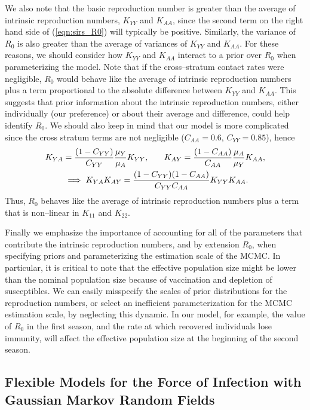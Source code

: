 We also note that the basic reproduction number is greater than the average of intrinsic reproduction numbers, $ K_{YY} $ and $ K_{AA} $, since the second term on the right hand side of (\ref{eqn:sirs_R0}) will typically be positive. Similarly, the variance of $ R_0 $ is also greater than the average of variances of $ K_{YY} $ and $ K_{AA} $. For these reasons, we should consider how $ K_{YY} $ and $ K_{AA} $ interact to a prior over $ R_0 $ when parameterizing the model. Note that if the cross--stratum contact rates were negligible, $ R_0 $ would behave like the average of intrinsic reproduction numbers plus a term proportional to the absolute difference between $ K_{YY} $ and $ K_{AA} $. This suggests that prior information about the intrinsic reproduction numbers, either individually (our preference) or about their average and difference, could help identify $ R_0 $. We should also keep in mind that our model is more complicated since the cross stratum terms are not negligible ($ C_{AA} = 0.6 $, $ C_{YY}=0.85 $), hence
\begin{align*}
K_{YA} &= \frac{(1 - C_{YY})}{C_{YY}}\frac{\mu_Y}{\mu_A}K_{YY},\hspace{0.25in}
K_{AY} = \frac{(1 - C_{AA})}{C_{AA}}\frac{\mu_A}{\mu_Y}K_{AA},\\
&\implies K_{YA}K_{AY} = \frac{(1 - C_{YY})(1-C_{AA})}{C_{YY}C_{AA}}K_{YY}K_{AA}.
\end{align*} 
Thus, $ R_0 $ behaves like the average of intrinsic reproduction numbers plus a term that is non--linear in $ K_{11} $ and $ K_{22} $.

Finally we emphasize the importance of accounting for all of the parameters that contribute the intrinsic reproduction numbers, and by extension $ R_0 $, when specifying priors and parameterizing the estimation scale of the MCMC. In particular, it is critical to note that the effective population size might be lower than the nominal population size because of vaccination and depletion of susceptibles. We can easily misspecify the scales of prior distributions for the reproduction numbers, or select an inefficient parameterization for the MCMC estimation scale, by neglecting this dynamic. In our model, for example, the value of $ R_0 $ in the first season, and the rate at which recovered individuals lose immunity, will affect the effective population size at the beginning of the second season. 

\subsection{Flexible Models for the Force of Infection with Gaussian Markov Random Fields}
\label{subsec:flu_gmrf}

